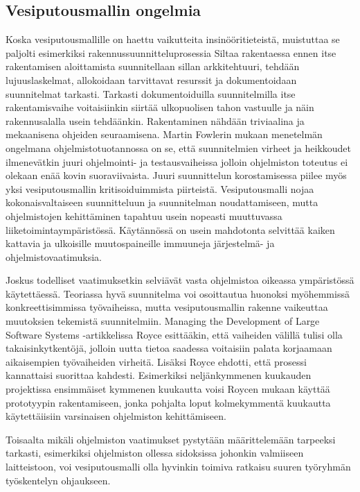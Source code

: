 \documentclass[finnish,12pt]{tktltiki2}
\theoremstyle{definition}
\theoremstyle{remark}
\begin{document}
\subsection{Vesiputousmallin ongelmia}

Koska vesiputousmallille on haettu vaikutteita insinööritieteistä, muistuttaa se paljolti esimerkiksi rakennussuunnitteluprosessia \cite{Sommerville10} Siltaa rakentaessa ennen itse rakentamisen aloittamista suunnitellaan sillan arkkitehtuuri, tehdään lujuuslaskelmat, allokoidaan tarvittavat resurssit ja dokumentoidaan suunnitelmat tarkasti. Tarkasti dokumentoiduilla suunnitelmilla itse rakentamisvaihe voitaisiinkin siirtää ulkopuolisen tahon vastuulle ja näin rakennusalalla usein tehdäänkin. \cite{Fowler05} Rakentaminen nähdään triviaalina ja mekaanisena ohjeiden seuraamisena. Martin Fowlerin mukaan menetelmän ongelmana ohjelmistotuotannossa on se, että suunnitelmien virheet ja heikkoudet ilmenevätkin juuri ohjelmointi- ja testausvaiheissa jolloin ohjelmiston toteutus ei olekaan enää kovin suoraviivaista. Juuri suunnittelun korostamisessa piilee myös yksi vesiputousmallin kritisoiduimmista piirteistä. Vesiputousmalli nojaa kokonaisvaltaiseen suunnitteluun ja suunnitelman noudattamiseen, mutta ohjelmistojen kehittäminen tapahtuu usein nopeasti muuttuvassa liiketoimintaympäristössä. Käytännössä on usein mahdotonta selvittää kaiken kattavia ja ulkoisille muutospaineille immuuneja järjestelmä- ja ohjelmistovaatimuksia. \cite{Sommerville10} 

Joskus todelliset vaatimuksetkin selviävät vasta ohjelmistoa oikeassa ympäristössä käytettäessä. Teoriassa hyvä suunnitelma voi osoittautua huonoksi myöhemmissä konkreettisimmissa työvaiheissa, mutta vesiputousmallin rakenne vaikeuttaa muutoksien tekemistä suunnitelmiin. Managing the Development of Large Software Systems -artikkelissa Royce esittääkin, että vaiheiden välillä tulisi olla takaisinkytkentöjä, jolloin uutta tietoa saadessa voitaisiin palata korjaamaan aikaisempien työvaiheiden virheitä. \cite{Royce1970} Lisäksi Royce ehdotti, että prosessi kannattaisi suorittaa kahdesti. Esimerkiksi neljänkymmenen kuukauden projektissa ensimmäiset kymmenen kuukautta voisi Roycen mukaan käyttää prototyypin rakentamiseen, jonka pohjalta loput kolmekymmentä kuukautta käytettäiisiin varsinaisen ohjelmiston kehittämiseen.

Toisaalta mikäli ohjelmiston vaatimukset pystytään määrittelemään tarpeeksi tarkasti, esimerkiksi ohjelmiston ollessa sidoksissa johonkin valmiiseen laitteistoon, voi vesiputousmalli olla hyvinkin toimiva ratkaisu suuren työryhmän työskentelyn ohjaukseen.
\end{document}
